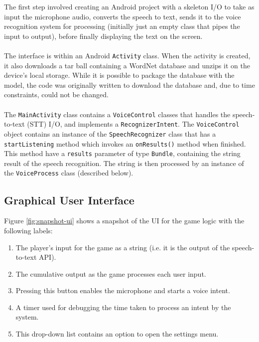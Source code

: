 \documentclass[11pt]{article}
\begin{document}
The first step involved creating an Android project with a skeleton I/O to take as input the microphone audio, converts the speech to text, sends it to the voice recognition system for processing (initially just an empty class that pipes the input to output), before finally displaying the text on the screen.
\\
\\
The interface is within an Android \texttt{Activity} class. When the activity is created, it also downloads a tar ball containing a WordNet database and unzips it on the device's local storage. While it is possible to package the database with the model, the code was originally written to download the database and, due to time constraints, could not be changed.
\\
\\
The \texttt{MainActivity} class contains a \texttt{VoiceControl} classes that  handles the speech-to-text (STT) I/O, and implements a \texttt{RecognizerIntent}. The \texttt{VoiceControl} object contains an instance of the \texttt{SpeechRecognizer} class that has a \texttt{startListening} method which invokes an \texttt{onResults()} method when finished. This method have a \texttt{results} parameter of type \texttt{Bundle}, containing the string result of the speech recognition. The string is then processed by an instance of the \texttt{VoiceProcess} class (described below).

\subsection{Graphical User Interface}

Figure \ref{fig:snapshot-ui} shows a snapshot of the UI for the game logic with the following labels:

\begin{enumerate}
	\item The player's input for the game as a string (i.e. it is the output of the speech-to-text API).
	\item The cumulative output as the game processes each user input.
	\item Pressing this button enables the microphone and starts a voice intent.
	\item A timer used for debugging the time taken to process an intent by the system.
	\item This drop-down list contains an option to open the settings menu.
\end{enumerate}
\end{document}

